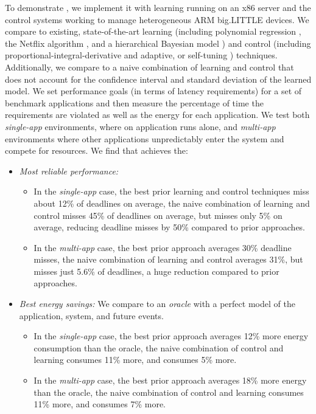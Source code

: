 To demonstrate \SYSTEM{}, we implement it with learning running on an
x86 server and the control systems working to manage heterogeneous ARM
big.LITTLE devices.  We compare \SYSTEM{} to existing,
state-of-the-art learning (including polynomial
regression \cite{}, the Netflix algorithm \cite{}, and a hierarchical
Bayesian model \cite{}) and control (including
proportional-integral-derivative \cite{} and adaptive, or self-tuning
\cite{}) techniques.  Additionally, we compare to a naive combination
of learning and control that does not account for the confidence
interval and standard deviation of the learned model.  We set
performance goals (in terms of latency requirements) for a set of
benchmark applications and then measure the percentage of time the
requirements are violated as well as the energy for each application.
We test both \emph{single-app} environments, where on application runs
alone, and \emph{multi-app} environments where other applications
unpredictably enter the system and compete for resources.  We find
that \SYSTEM{} achieves the:
\begin{itemize} 
\item \textit{Most reliable performance:} 
 \begin{itemize} 
 \item In the \emph{single-app} case, the best prior learning and
   control techniques miss about 12\% of deadlines on average, the
   naive combination of learning and control misses 45\% of deadlines
   on average, but \SYSTEM{} misses only 5\% on average, reducing
   deadline misses by 50\% compared to prior approaches.
 \item In the \emph{multi-app} case, the best prior approach averages
   30\% deadline misses, the naive combination of learning and control
   averages 31\%, but \SYSTEM{} misses just 5.6\% of deadlines, a huge
   reduction compared to prior approaches.
\end{itemize}
  \item \textit{Best energy savings:} We compare to an \emph{oracle}
    with a perfect model of the application, system, and future
    events.
    \begin{itemize}
    \item In the \emph{single-app} case, the best prior approach
      averages 12\% more energy consumption than the oracle, the naive
      combination of control and learning consumes 11\% more, and
      \SYSTEM{} consumes 5\% more.  
    \item In the \emph{multi-app} case, the best prior approach
      averages 18\% more energy than the oracle, the naive combination
      of control and learning consumes 11\% more, and \SYSTEM{}
      consumes 7\% more.
    \end{itemize}
\end{itemize}

